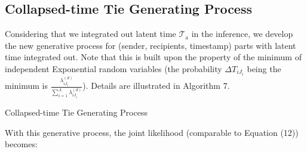 \documentclass[a4paper]{article}
\begin{document}
        \subsection{Collapsed-time Tie Generating Process} \label{subsubsec: collapsed time Generative Process}
        Considering that we integrated out latent time $\mathcal{T}_{\mbox{a}}$ in the inference, we develop the new generative process for (sender, recipients, timestamp) parts with latent time integrated out. Note that this is built upon the property of the minimum of independent Exponential random variables (the probability $\Delta T_{i{J_i}}$ being the minimum is $\frac{\lambda_{i{J_i}}^{(d)}}{\sum_{i=1}^A\lambda_{i{J_i}}^{(d)}}$). Details are illustrated in Algorithm 7.
        \begin{algorithm}[H]
        	\SetAlgoLined
        	\caption{Collapsed-time Tie Generating Process}
        \end{algorithm}
        \noindent With this generative process, the joint likelihood (comparable to Equation (12)) becomes:
\end{document}
